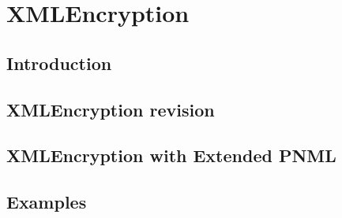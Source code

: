 
\chapter{XMLEncryption} %

\label{ChapterX} %


\section{Introduction}

\section{XMLEncryption revision}

\section{XMLEncryption with Extended PNML}

\section{Examples}


